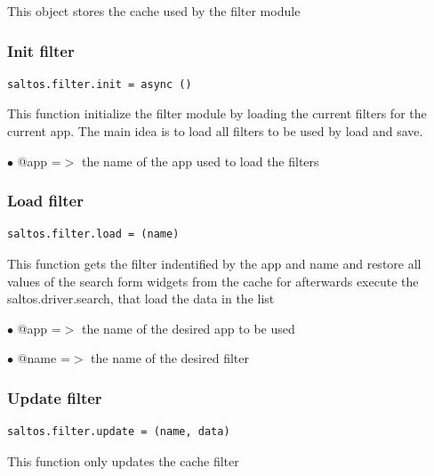 \documentclass[a4paper]{article}
\begin{document}
This object stores the cache used by the filter module

\hypertarget{toc209}{}
\subsubsection{Init filter}

\begin{lstlisting}
saltos.filter.init = async ()
\end{lstlisting}

This function initialize the filter module by loading the current filters for
the current app. The main idea is to load all filters to be used by load and
save.

\begin{compactitem}
\item[\color{myblue}$\bullet$] @app =$>$ the name of the app used to load the filters
\end{compactitem}

\hypertarget{toc210}{}
\subsubsection{Load filter}

\begin{lstlisting}
saltos.filter.load = (name)
\end{lstlisting}

This function gets the filter indentified by the app and name and restore
all values of the search form widgets from the cache for afterwards execute
the saltos.driver.search, that load the data in the list

\begin{compactitem}
\item[\color{myblue}$\bullet$] @app  =$>$ the name of the desired app to be used
\item[\color{myblue}$\bullet$] @name =$>$ the name of the desired filter
\end{compactitem}

\hypertarget{toc211}{}
\subsubsection{Update filter}

\begin{lstlisting}
saltos.filter.update = (name, data)
\end{lstlisting}

This function only updates the cache filter
\end{document}
